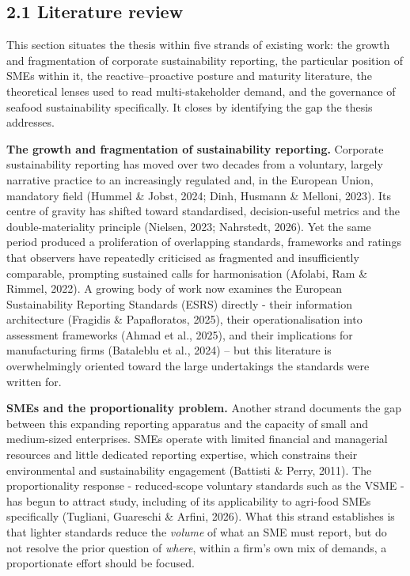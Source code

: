 
\subsection{2.1 Literature review}\label{literature-review}

This section situates the thesis within five strands of existing work: the
growth and fragmentation of corporate sustainability reporting, the particular
position of SMEs within it, the reactive--proactive posture and maturity
literature, the theoretical lenses used to read multi-stakeholder demand, and the
governance of seafood sustainability specifically. It closes by identifying the
gap the thesis addresses.

\textbf{The growth and fragmentation of sustainability reporting.} Corporate
sustainability reporting has moved over two decades from a voluntary,
largely narrative practice to an increasingly regulated and, in the European
Union, mandatory field (Hummel \& Jobst, 2024; Dinh, Husmann \& Melloni, 2023).
Its centre of gravity has shifted toward standardised, decision-useful metrics
and the double-materiality principle (Nielsen, 2023; Nahrstedt, 2026). Yet the
same period produced a proliferation of overlapping standards, frameworks and
ratings that observers have repeatedly criticised as fragmented and
insufficiently comparable, prompting sustained calls for harmonisation (Afolabi,
Ram \& Rimmel, 2022). A growing body of work now examines the European
Sustainability Reporting Standards (ESRS) directly - their information
architecture (Fragidis \& Papafloratos, 2025), their operationalisation into
assessment frameworks (Ahmad et al., 2025), and their implications for
manufacturing firms (Bataleblu et al., 2024) -- but this literature is
overwhelmingly oriented toward the large undertakings the standards were written
for.

\textbf{SMEs and the proportionality problem.} Another strand documents the
gap between this expanding reporting apparatus and the capacity of small and
medium-sized enterprises. SMEs operate with limited financial and managerial
resources and little dedicated reporting expertise, which constrains their
environmental and sustainability engagement (Battisti \& Perry, 2011). The
proportionality response - reduced-scope voluntary standards such as the VSME
- has begun to attract study, including of its applicability to agri-food SMEs
specifically (Tugliani, Guareschi \& Arfini, 2026). What this strand establishes
is that lighter standards reduce the \emph{volume} of what an SME must report, but
do not resolve the prior question of \emph{where}, within a firm's own mix of
demands, a proportionate effort should be focused.


